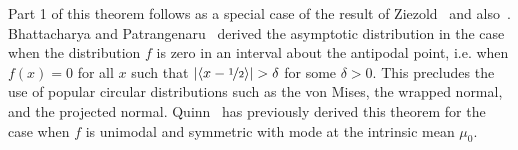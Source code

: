 \documentclass[journal]{../bib/IEEEtran}
\begin{document}
Part 1 of this theorem follows as a special case of the result of Ziezold~\cite{Ziezold_intrinsic_mean_1977} and also~\cite[Theorem 2.3(b)]{Bhattacharya_int_ext_means_2003}. Bhattacharya and Patrangenaru~\cite[Theorem 2.3]{Bhattacharya_int_ext_means_2005} derived the asymptotic distribution in the case when the distribution $f$ is zero in an interval about the antipodal point, i.e. when $f(x) = 0$ for all $x$ such that ${\left| \left< x - \nicefrac{1}{2} \right> \right|} > \delta$ for some $\delta > 0$.  This precludes the use of popular circular distributions such as the von Mises, the wrapped normal, and the projected normal.  Quinn~\cite{Quinn2007} has previously derived this theorem for the case when $f$ is unimodal and symmetric with mode at the intrinsic mean $\mu_0$.

\end{document}
